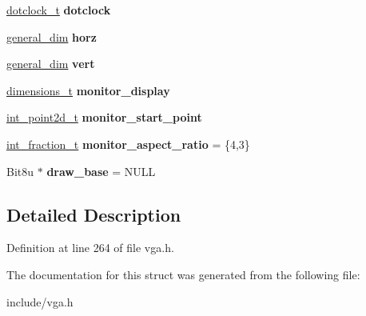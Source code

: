 \begin{DoxyCompactItemize}
\item 
\hypertarget{structVGA__Draw__2_a28eb448b7f4d4efcd06721d127e53e9b}{\hyperlink{structVGA__Draw__2_1_1dotclock__t}{dotclock\-\_\-t} {\bfseries dotclock}}\label{structVGA__Draw__2_a28eb448b7f4d4efcd06721d127e53e9b}

\item 
\hypertarget{structVGA__Draw__2_aa8fb38e7d26078d8f2987467317475ae}{\hyperlink{structVGA__Draw__2_1_1general__dim}{general\-\_\-dim} {\bfseries horz}}\label{structVGA__Draw__2_aa8fb38e7d26078d8f2987467317475ae}

\item 
\hypertarget{structVGA__Draw__2_a03774775c634f55aeb9bb0599b938c46}{\hyperlink{structVGA__Draw__2_1_1general__dim}{general\-\_\-dim} {\bfseries vert}}\label{structVGA__Draw__2_a03774775c634f55aeb9bb0599b938c46}

\item 
\hypertarget{structVGA__Draw__2_a670714961afff08825b9864193f9d171}{\hyperlink{structVGA__Draw__2_1_1dimensions__t}{dimensions\-\_\-t} {\bfseries monitor\-\_\-display}}\label{structVGA__Draw__2_a670714961afff08825b9864193f9d171}

\item 
\hypertarget{structVGA__Draw__2_a6d68981d4b40e63401c1e340ef3d4ef2}{\hyperlink{structVGA__Draw__2_1_1int__point2d__t}{int\-\_\-point2d\-\_\-t} {\bfseries monitor\-\_\-start\-\_\-point}}\label{structVGA__Draw__2_a6d68981d4b40e63401c1e340ef3d4ef2}

\item 
\hypertarget{structVGA__Draw__2_a0911645c69d4f4719159256b146b6a84}{\hyperlink{structVGA__Draw__2_1_1int__fraction__t}{int\-\_\-fraction\-\_\-t} {\bfseries monitor\-\_\-aspect\-\_\-ratio} = \{4,3\}}\label{structVGA__Draw__2_a0911645c69d4f4719159256b146b6a84}

\item 
\hypertarget{structVGA__Draw__2_a8f503d1e1c9c0a4cff112c306f5a9e9f}{Bit8u $\ast$ {\bfseries draw\-\_\-base} = N\-U\-L\-L}\label{structVGA__Draw__2_a8f503d1e1c9c0a4cff112c306f5a9e9f}

\end{DoxyCompactItemize}


\subsection{Detailed Description}


Definition at line 264 of file vga.\-h.



The documentation for this struct was generated from the following file\-:\begin{DoxyCompactItemize}
\item 
include/vga.\-h\end{DoxyCompactItemize}
